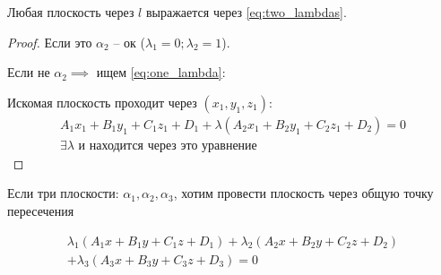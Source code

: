 \documentclass[main]{subfiles}
\begin{document}
\begin{proposition}
    Любая плоскость через $l$ выражается через \eqref{eq:two_lambdas}.
\end{proposition}
\begin{proof}
    Если это $\alpha_2$ -- ок ($\lambda_1 = 0; \lambda_2 =1$).

    Если не $\alpha_2 \implies$ ищем \eqref{eq:one_lambda}:

    Искомая плоскость проходит через $(x_1, y_1, z_1)$:
    \begin{gather*}
        A_1 x_1 + B_1 y_1 + C_1 z_1 + D_1 + \lambda(A_2 x_1 + B_2 y_1 + C_2 z_1 + D_2) = 0\\
        \exists \lambda \text{ и находится через это уравнение }
    \end{gather*}
\end{proof}

Если три плоскости: $\alpha_1, \alpha_2, \alpha_3$,
хотим провести плоскость через общую точку пересечения

\begin{multline*}
    \lambda_1(A_1x + B_1y +C_1z + D_1) + \lambda_2 (A_2x + B_2y +C_2z + D_2)\\
    + \lambda_3 (A_3x + B_3y +C_3z + D_3)  = 0
\end{multline*}
\end{document}
